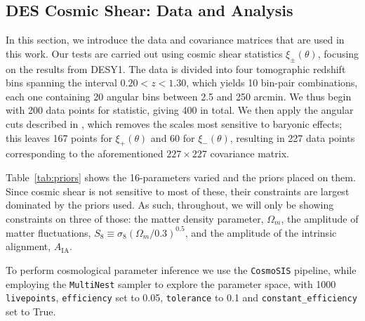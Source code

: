 \documentclass[aps, prd, twocolumn, superscriptaddress, nofootinbib, amssymb, amsmath]{revtex4-2}
\begin{document}
\subsection{DES Cosmic Shear: Data and Analysis}\label{subsec:data_and_analysis}

In this section, we introduce the data and covariance matrices that are used in this work. Our tests are carried out using cosmic shear statistics $\xi_\pm(\theta)$, focusing on the results from DESY1. The data is divided into four tomographic redshift bins spanning the interval $0.20 < z < 1.30$, which yields 10 bin-pair combinations, each one containing 20 angular bins between 2.5 and 250 arcmin. We thus begin with 200 data points for statistic, giving 400 in total. We then apply the angular cuts described in \cite{Abbott:2018cms}, which removes the scales most sensitive to baryonic effects; this leaves 167 points for $\xi_+(\theta)$ and 60 for $\xi_-(\theta)$, resulting in 227 data points corresponding to the aforementioned $227 \times 227$ covariance matrix. 

Table~\ref{tab:priors} shows the 16-parameters varied and the priors placed on them. Since cosmic shear is not sensitive to most of these, their constraints are largest dominated by the priors used. As such, throughout, we will only be showing constraints on three of those: the matter density parameter, $\Omega_m$, the amplitude of matter fluctuations, $S_8 \equiv \sigma_8 (\Omega_m/0.3)^{0.5}$, and the amplitude of the intrinsic alignment, $A_{\text{IA}}$.

To perform cosmological parameter inference we use the \texttt{CosmoSIS} \cite{Zuntz:2015med, Lewis:2000taj, Kirk:2012mnras, Kilbinger:2009aa, Howlett:2012jcap, Bridle:2007njp, Takahashi:2012taj, Smith:2003mnras} pipeline, while employing the \texttt{MultiNest} \cite{Feroz:2009fhb} sampler to explore the parameter space, with 1000 \texttt{livepoints}, \texttt{efficiency} set to 0.05, \texttt{tolerance} to 0.1 and \texttt{constant\_efficiency} set to True.
\end{document}
